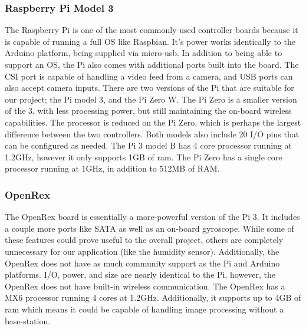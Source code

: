 \documentclass[onecolumn, draftclsnofoot,10pt, compsoc]{IEEEtran}
\begin{document}

\subsubsection{Raspberry Pi Model 3}

The Raspberry Pi is one of the most commonly used controller boards 
because it is capable of running a full OS like Raspbian. It's 
power works identically to the Arduino platform, being supplied via 
micro-usb. In addition to being able to support an OS, the Pi also 
comes with additional ports built into the board. The CSI port is 
capable of handling a video feed from a camera, and USB ports can 
also accept camera inputs. There are two versions of the Pi that 
are suitable for our project; the Pi model 3\cite{r25}, and 
the Pi Zero W\cite{r3}. The Pi Zero is a smaller version of the 3, 
with less processing power, but still maintaining the on-board 
wireless capabilities. 
The processor is reduced on the Pi Zero, which is perhaps the 
largest difference between the two controllers. Both models also 
include 20 I/O pins that can be configured as needed. The Pi 3 
model B has 4 core processor running at 1.2GHz, however it only 
supports 1GB of ram. The Pi Zero has a single core processor 
running at 1GHz, in addition to 512MB of RAM.   




\subsubsection{OpenRex}


The OpenRex\cite{r26} board is essentially a more-powerful version 
of the Pi 3. It includes a couple more ports like SATA as well as 
an on-board gyroscope. 
While some of these features could prove useful to the 
overall project, others are completely unnecessary for our 
application (like the humidity sensor). Additionally, the OpenRex 
does not have as much community support as the Pi and Arduino 
platforms. I/O, power, and size are nearly identical to the Pi, 
however, the OpenRex does not have built-in wireless communication. 
The OpenRex has a MX6 processor running 4 cores at 1.2GHz. 
Additionally, it supports up to 4GB of ram which means it could be 
capable of handling image processing without a base-station.  
\end{document}
